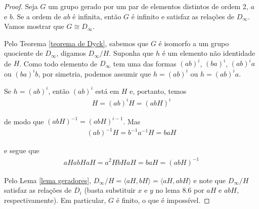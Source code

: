 	\begin{proof}
		Seja $G$ um grupo gerado por um par de elementos distintos de ordem 2, $a$ e $b$. 
		Se a ordem de $ab$ é infinita, então $G$ é infinito e satisfaz as relações de $D_{\infty}$. 
		Vamos mostrar que $G\cong D_{\infty}$. 
		
		\par\vspace{0.3cm} Pelo Teorema \eqref{teorema de Dyck}, sabemos que $G$ é isomorfo a um 
		grupo quociente de $D_{\infty}$, digamos $D_{\infty}/H$. Suponha que $h$ é um elemento não 
		identidade de $H$. Como todo elemento de $D_{\infty}$ tem uma das formas 
		$(ab)^i$, $(ba)^i$, $(ab)^ia$ ou $(ba)^ib$, por simetria, podemos assumir que 
		$h = (ab)^i$ ou $h = (ab)^ia$.
		
		\par\vspace{0.3cm} Se $h = (ab)^i$, então $(ab)^i$ está em $H$ e, portanto, temos
		\begin{align*}
		    H = (ab)^iH = (abH)^i
		\end{align*}
		\par\vspace{0.3cm} de modo que $(abH)^{-1} = (abH)^{i-1}$. Mas
		\begin{align*}
		    (ab)^{-1}H = b^{-1}a^{-1}H = baH
		\end{align*}
		\par\vspace{0.3cm} e segue que
		\begin{align*}
		    aHabHaH = a^2HbHaH = baH = (abH)^{-1}
		\end{align*}
		\par\vspace{0.3cm} Pelo Lema \eqref{lema geradores}, $D_{\infty}/H = \langle aH, bH \rangle 
		= \langle aH, abH \rangle$ e note que $D_{\infty}/H$ satisfaz as relações de $D_i$ 
		(basta substituir $x$ e $y$ no lema 8.6 por $aH$ e $abH$, respectivamente). Em particular, 
		$G$ é finito, o que é impossível.
		

\end{proof}
